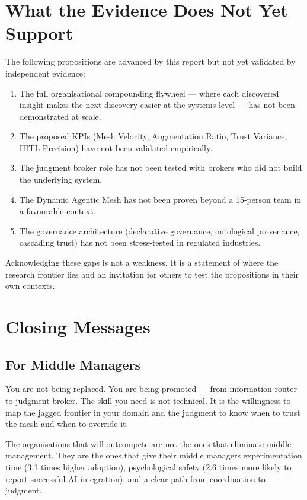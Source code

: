 \section{What the Evidence Does Not Yet Support}

The following propositions are advanced by this report but not yet validated by independent evidence:

\begin{enumerate}
  \item The full organisational compounding flywheel --- where each discovered insight makes the next discovery easier at the systems level --- has not been demonstrated at scale.
  \item The proposed KPIs (Mesh Velocity, Augmentation Ratio, Trust Variance, HITL Precision) have not been validated empirically.
  \item The judgment broker role has not been tested with brokers who did not build the underlying system.
  \item The Dynamic Agentic Mesh has not been proven beyond a 15-person team in a favourable context.
  \item The governance architecture (declarative governance, ontological provenance, cascading trust) has not been stress-tested in regulated industries.
\end{enumerate}

Acknowledging these gaps is not a weakness. It is a statement of where the research frontier lies and an invitation for others to test the propositions in their own contexts.

\section{Closing Messages}

\subsection{For Middle Managers}

You are not being replaced. You are being promoted --- from information router to judgment broker. The skill you need is not technical. It is the willingness to map the jagged frontier in your domain and the judgment to know when to trust the mesh and when to override it.

The organisations that will outcompete are not the ones that eliminate middle management. They are the ones that give their middle managers experimentation time (3.1 times higher adoption), psychological safety (2.6 times more likely to report successful AI integration), and a clear path from coordination to judgment.


